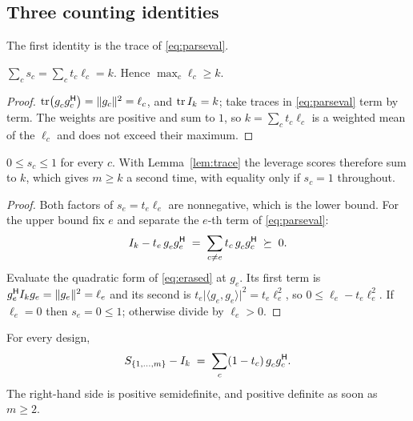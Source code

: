 \subsection{Three counting identities}

The first identity is the trace of \eqref{eq:parseval}.

\begin{lemma}[Lean]\label{lem:trace}
$\sum_c s_c=\sum_c t_c\ell_c=k$.  Hence $\max_c \ell_c\ge k$.
\end{lemma}

\begin{proof}
$\tr\bigl(g_c^{\vphantom{\mathsf{H}}}g_c\adj\bigr)=\lVert g_c\rVert^2=\ell_c$, and
$\operatorname{tr} I_k=k$; take traces in \eqref{eq:parseval} term by term.  The
weights are positive and sum to $1$, so $k=\sum_c t_c\ell_c$ is a
weighted mean of the $\ell_c$ and does not exceed their maximum.
\end{proof}

\begin{lemma}[Lean]\label{lem:share}
$0\le s_c\le1$ for every $c$.  With Lemma~\ref{lem:trace} the leverage
scores therefore sum to $k$, which gives $m\ge k$ a second time, with
equality only if $s_c=1$ throughout.
\end{lemma}

\begin{proof}
Both factors of $s_e=t_e\ell_e$ are nonnegative, which is the lower
bound.  For the upper bound fix $e$ and separate the $e$-th term of
\eqref{eq:parseval}:
\begin{equation}\label{eq:erased}
  I_k-t_e\,g_e^{\vphantom{\mathsf{H}}}g_e\adj
  \;=\;\sum_{c\ne e}t_c\,g_c^{\vphantom{\mathsf{H}}}g_c\adj\;\psd\;0 .
\end{equation}
Evaluate the quadratic form of \eqref{eq:erased} at $g_e$.  Its first
term is $g_e^{\mathsf{H}} I_kg_e=\lVert g_e\rVert^2=\ell_e$ and its second is
$t_e\lvert\langle g_e,g_e\rangle\rvert^2=t_e\ell_e^2$, so
$0\le\ell_e-t_e\ell_e^2$.  If $\ell_e=0$ then $s_e=0\le1$; otherwise
divide by $\ell_e>0$.
\end{proof}

\begin{lemma}[Lean]\label{lem:coparseval}
For every design,
\begin{equation}\label{eq:coparseval}
  S_{\{1,\dots,m\}}-I_k\;=\;\sum_{c}(1-t_c)\,g_c^{\vphantom{\mathsf{H}}}g_c\adj .
\end{equation}
The right-hand side is positive semidefinite, and positive definite as
soon as $m\ge2$.
\end{lemma}

